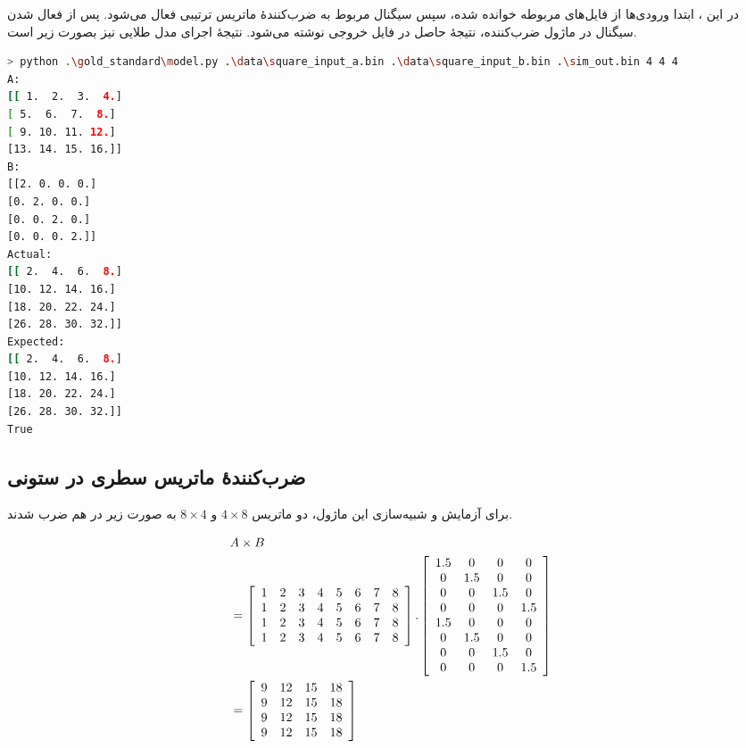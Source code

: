 \documentclass[conference]{IEEEtran-ModifiedForMVIP}
\begin{document}
در این
،
ابتدا ورودی‌ها از فایل‌های مربوطه خوانده شده، سپس سیگنال
مربوط به ضرب‌کنندهٔ ماتریس ترتیبی فعال می‌شود. پس از فعال شدن سیگنال
در ماژول ضرب‌کننده، نتیجهٔ حاصل در فایل خروجی نوشته می‌شود.
نتیجهٔ اجرای مدل طلایی نیز بصورت زیر است.

\begin{latin}
\begin{lstlisting}[language=Bash]
> python .\gold_standard\model.py .\data\square_input_a.bin .\data\square_input_b.bin .\sim_out.bin 4 4 4
A:
[[ 1.  2.  3.  4.]
[ 5.  6.  7.  8.]
[ 9. 10. 11. 12.]
[13. 14. 15. 16.]]
B:
[[2. 0. 0. 0.]
[0. 2. 0. 0.]
[0. 0. 2. 0.]
[0. 0. 0. 2.]]
Actual:
[[ 2.  4.  6.  8.]
[10. 12. 14. 16.]
[18. 20. 22. 24.]
[26. 28. 30. 32.]]
Expected:
[[ 2.  4.  6.  8.]
[10. 12. 14. 16.]
[18. 20. 22. 24.]
[26. 28. 30. 32.]]
True
\end{lstlisting}
\end{latin}

\subsection{
    ضرب‌کنندهٔ ماتریس سطری در ستونی
}

برای آزمایش و شبیه‌سازی این ماژول، دو ماتریس
$4 \times 8$
و
$8 \times 4$
به صورت زیر در هم ضرب شدند.

\scriptsize
\begin{align*}
    &A \times B\\
    &=\left[
        \begin{array}{c c c c c c c c}
            1&2&3&4&5&6&7&8\\
            1&2&3&4&5&6&7&8\\
            1&2&3&4&5&6&7&8\\
            1&2&3&4&5&6&7&8
        \end{array}
    \right] . \left[
        \begin{array}{c c c c}
            1.5&0&0&0\\
            0&1.5&0&0\\
            0&0&1.5&0\\
            0&0&0&1.5\\
            1.5&0&0&0\\
            0&1.5&0&0\\
            0&0&1.5&0\\
            0&0&0&1.5
        \end{array}
    \right]\\
    &= \left[
        \begin{array}{c c c c}
            9&12&15&18\\
            9&12&15&18\\
            9&12&15&18\\
            9&12&15&18
        \end{array}
    \right]
\end{align*}
\normalsize
\end{document}
